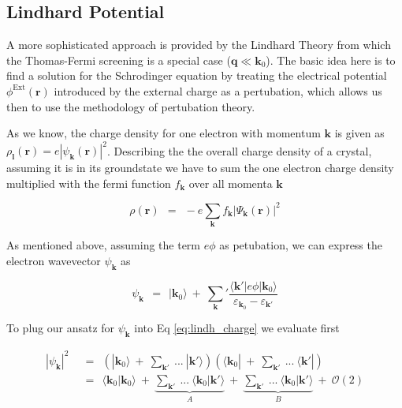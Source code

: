 \documentclass[10pt]{report}
\numberwithin{equation}{chapter}
\newcommand{\refEq}[1]{
  Eq  \ref{#1}
}
\newcommand{\OO}{ %
  \mathcal{O}
}
\begin{document}
\subsection{Lindhard Potential}

A more sophisticated approach is provided by the Lindhard Theory from which the Thomas-Fermi screening is a special case ($\mathbf{q} \ll \mathbf{k}_0$). The basic idea here is to find a solution for the Schrodinger equation by treating the electrical potential $\phi^\text{Ext}(\mathbf{r})$ introduced by the external charge as a pertubation, which allows us then to use the methodology of pertubation theory.

As we know, the charge density for one electron with momentum $\mathbf{k}$ is given as $\rho_\mathbf{l}(\mathbf{r}) = e|\psi_\mathbf{k}(\mathbf{r})|^2$. Describing the the overall charge density of a crystal, assuming it is in its groundstate we have to sum the one electron charge density multiplied with the fermi function $f_\mathbf{k}$ over all momenta $\mathbf{k}$

\begin{equation} \label{eq:lindh_charge}
  \rho(\mathbf{r}) ~~=~~ -e \sum_\mathbf{k} f_\mathbf{k} | \Psi_\mathbf{k}(\mathbf{r}) |^2
\end{equation}


As mentioned above, assuming the term $e\phi$ as petubation, we can express the electron wavevector $\psi_\mathbf{k}$ as 

\begin{equation} \label{eq:lindh_wf}
  \psi_\mathbf{k} ~~=~~ | \mathbf{k}_0 \rangle ~+~ \sum_\mathbf{k}' \frac{\langle \mathbf{k}' | e\phi | \mathbf{k}_0 \rangle}{\varepsilon_{\mathbf{k}_0} - \varepsilon_{\mathbf{k}'}}
\end{equation}


To plug our ansatz for $\psi_\mathbf{k}$ into \refEq{eq:lindh_charge} we evaluate first

\begin{align} \label{eq:lindh_wf_squared}
  | \psi_\mathbf{k} |^2 ~~& =~~ \left( |\mathbf{k}_0 \rangle ~+~ \sum_{\mathbf{k}'}\ ...\ |\mathbf{k}' \rangle \right) \left( \langle \mathbf{k}_0 | ~+~ \sum_{\mathbf{k}'}\ ...\ \langle \mathbf{k}' | \right) \nonumber \\
  ~~& =~~ \langle \mathbf{k}_0 | \mathbf{k}_0 \rangle ~+~ 
  \underbrace{\sum_{\mathbf{k}'}\ ...\ \langle \mathbf{k}_0 | \mathbf{k}' \rangle}_{A} ~+~ 
  \underbrace{\sum_{\mathbf{k}'}\ ...\ \langle \mathbf{k}_0 | \mathbf{k}' \rangle}_{B} ~+~ \OO(2)
\end{align}
\end{document}
